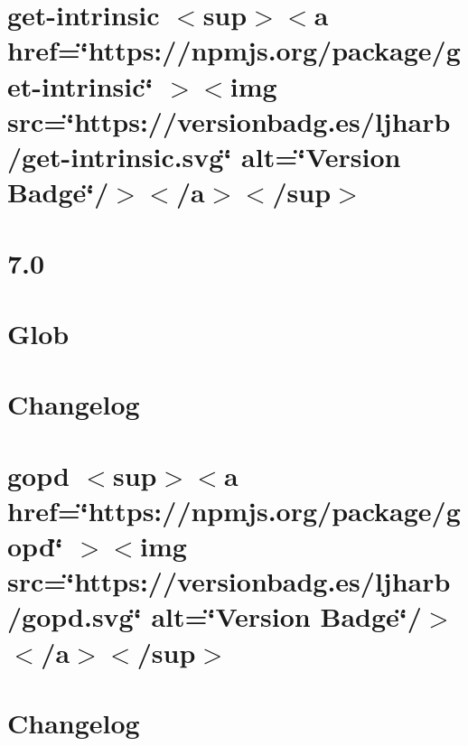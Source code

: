 \documentclass[twoside]{book}
\newcommand{\+}{\discretionary{\mbox{\scriptsize$\hookleftarrow$}}{}{}}
\begin{document}
\chapter{get-\/intrinsic \texorpdfstring{$<$}{<}sup\texorpdfstring{$>$}{>}\texorpdfstring{$<$}{<}a href=\char`\"{}https\+://npmjs.\+org/package/get-\/intrinsic\char`\"{} \texorpdfstring{$>$}{>}\texorpdfstring{$<$}{<}img src=\char`\"{}https\+://versionbadg.\+es/ljharb/get-\/intrinsic.\+svg\char`\"{} alt=\char`\"{}\+Version Badge\char`\"{}/\texorpdfstring{$>$}{>}\texorpdfstring{$<$}{<}/a\texorpdfstring{$>$}{>}\texorpdfstring{$<$}{<}/sup\texorpdfstring{$>$}{>}}
\label{md_Backend_nodejs_node_modules_get_intrinsic_README}

\chapter{7.0}
\label{md_Backend_nodejs_node_modules_glob_changelog}

\chapter{Glob}
\label{md_Backend_nodejs_node_modules_glob_README}

\chapter{Changelog}
\label{md_Backend_nodejs_node_modules_gopd_CHANGELOG}

\chapter{gopd \texorpdfstring{$<$}{<}sup\texorpdfstring{$>$}{>}\texorpdfstring{$<$}{<}a href=\char`\"{}https\+://npmjs.\+org/package/gopd\char`\"{} \texorpdfstring{$>$}{>}\texorpdfstring{$<$}{<}img src=\char`\"{}https\+://versionbadg.\+es/ljharb/gopd.\+svg\char`\"{} alt=\char`\"{}\+Version Badge\char`\"{}/\texorpdfstring{$>$}{>}\texorpdfstring{$<$}{<}/a\texorpdfstring{$>$}{>}\texorpdfstring{$<$}{<}/sup\texorpdfstring{$>$}{>}}
\label{md_Backend_nodejs_node_modules_gopd_README}

\chapter{Changelog}
\label{md_Backend_nodejs_node_modules_has_property_descriptors_CHANGELOG}

\end{document}
